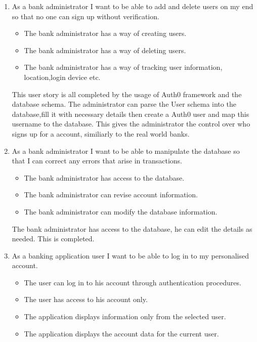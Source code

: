 \begin{itemize}
\begin{enumerate}
\begin{verbatim}
})
\end{verbatim}
        \item As a bank administrator I want to be able to add and delete users on my end so that no one can sign up without verification.
        \begin{itemize}
                \item The bank administrator has a way of creating users.
                \item The bank administrator has a way of deleting users.
                \item The bank administrator has a way of tracking user information, location,login device etc.
            \end{itemize}
        This user story is all completed by the usage of Auth0 framework and the database schema. The administrator can parse the User schema into the database,fill it with necessary details then create a Auth0 user and map this username to the database.
        This gives the administrator the control over who signs up for a account, similiarly to the real world banks.
        \item As a bank administrator I want to be able to manipulate the database so that I can correct any errors that arise in transactions.
        \begin{itemize}
                \item The bank administrator has access to the database.
                \item The bank administrator can revise account information.
                \item The bank administrator can modify the database information.
            \end{itemize}
            The bank administrator has access to the database, he can edit the details as needed. This is completed.
        \item As a banking application user I want to be able to log in to my personalised account.
        \begin{itemize}
                \item The user can log in to his account through authentication procedures.
                \item The user has access to his account only.
                \item The application displays information only from the selected user.
                \item The application displays the account data for the current user.
            \end{itemize}

\end{enumerate}
\end{itemize}

